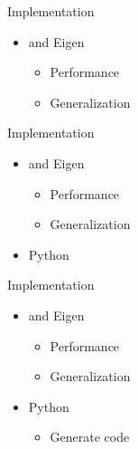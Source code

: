 \documentclass[10pt, t, xcolor=dvipsnames]{beamer}
\begin{document}
\begin{frame}[fragile]{Implementation}
    \begin{itemize}
        \item \CC and Eigen
            \begin{itemize}
                \item Performance
                \item Generalization
            \end{itemize}
    \end{itemize}
\end{frame}

\begin{frame}[fragile]{Implementation}
    \begin{itemize}
        \item \CC and Eigen
            \begin{itemize}
                \item Performance
                \item Generalization
            \end{itemize}
        \item Python
    \end{itemize}
\end{frame}

\begin{frame}[fragile]{Implementation}
    \begin{itemize}
        \item \CC and Eigen
            \begin{itemize}
                \item Performance
                \item Generalization
            \end{itemize}
        \item Python
            \begin{itemize}
               \item Generate \CC code 
            \end{itemize}
    \end{itemize}
\end{frame}
\end{document}
